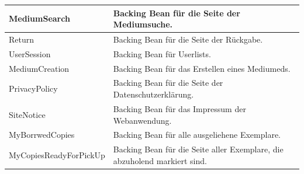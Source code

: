 \documentclass{article}
\begin{document}
\begin{center}
\begin{table}
\begin{tabular} { |p{}|p{}| }
             \hline
            MediumSearch & Backing Bean für die Seite der Mediumsuche.\\
             \hline
            Return & Backing Bean für die Seite der Rückgabe.\\
             \hline
              UserSession & Backing Bean für Userlists.\\
             \hline
            MediumCreation & Backing Bean für das Erstellen eines  Mediumeds.\\
             \hline
            PrivacyPolicy & Backing Bean für die Seite der Datenschutzerklärung.\\
            \hline
            SiteNotice & Backing Bean für das Impressum der  Webanwendung.\\
            \hline
            MyBorrwedCopies & Backing Bean für alle ausgeliehene Exemplare.\\
            \hline
            MyCopiesReadyForPickUp & Backing Bean für die Seite aller Exemplare, die abzuholend markiert sind.\\
            \hline
        \end{tabular}
        \end{table}
        \end{center}
        
       
\end{document}
